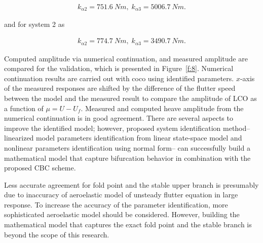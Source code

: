 \documentclass[openacc]{rsproca_new}%
\theoremstyle{own}
\newcommand{\Fref}[1]{Figure~\ref{#1}}
\begin{document}
\begin{align}\label{eq:2-15}
k_{\alpha2}=751.6 \: Nm, \; k_{\alpha3}=5006.7 \: Nm.
\end{align}

\noindent and for system 2 as

\begin{align}\label{eq:2-15-2}
k_{\alpha2}=774.7 \: Nm, \; k_{\alpha3}=3490.7 \: Nm.
\end{align}

Computed amplitude via numerical continuation, and measured amplitude are compared for the validation, which is presented in \Fref{f:8}. Numerical continuation results are carried out with coco \cite{dankowicz2013recipes} using identified parameters. $x$-axis of the measured responses are shifted by the difference of the flutter speed between the model and the measured result to compare the amplitude of LCO as a function of $\mu=U-U_f$. Measured and computed heave amplitude from the numerical continuation is in good agreement. There are several aspects to improve the identified model; however, proposed system identification method-- linearized model parameters identification from linear state-space model and nonlinear parameters identification using normal form-- can successfully build a mathematical model that capture bifurcation behavior in combination with the proposed CBC scheme.

Less accurate agreement for fold point and the stable upper branch is presumably due to inaccuracy of aeroelastic model of unsteady flutter equation in large response. To increase the accuracy of the parameter identification, more sophisticated aeroelastic model should be considered. However, building the mathematical model that captures the exact fold point and the stable branch is beyond the scope of this research.
\end{document}
